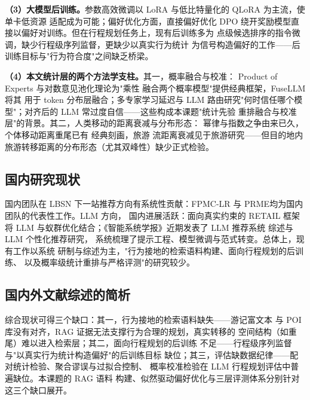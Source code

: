 \textbf{（3）大模型后训练。}参数高效微调以 LoRA\cite{hu2022lora}
与低比特量化的 QLoRA\cite{dettmers2023qlora} 为主流，使单卡低资源
适配成为可能；偏好优化方面，直接偏好优化 DPO\cite{rafailov2023dpo}
绕开奖励模型直接以偏好对训练。但在行程规划任务上，现有后训练多为
点级候选排序的指令微调，缺少行程级序列监督，更缺少以真实行为统计
为信号构造偏好的工作——后训练目标与"行为符合度"之间缺乏桥梁。

\textbf{（4）本文统计层的两个方法学支柱。}其一，概率融合与校准：
Product of Experts\cite{hinton2002poe} 与对数意见池化理论为"乘性
融合两个概率模型"提供经典框架，FuseLLM\cite{wan2024fusellm} 将其
用于 token 分布层融合；多专家学习延迟\cite{mao2023defer}与 LLM
路由\cite{ong2024routellm}研究"何时信任哪个模型"；对齐后的 LLM
常过度自信\cite{guo2017calibration}——这些构成本课题"统计先验
重排融合与校准层"的背景。其二，人类移动的距离衰减与分布形态：
幂律与指数之争由来已久\cite{chen2015decay}，个体移动距离重尾已有
经典刻画\cite{gonzalez2008understanding,simini2012universal}，旅游
流距离衰减见于旅游研究\cite{mckercher2003distance}——但目的地内
旅游转移距离的分布形态（尤其双峰性）缺少正式检验。

\subsection{国内研究现状}

国内团队在 LBSN 下一站推荐方向有系统性贡献：FPMC-LR\cite{cheng2013fpmclr}
与 PRME\cite{feng2015prme}均为国内团队的代表性工作。LLM 方向，
国内进展活跃：面向真实约束的 RETAIL 框架\cite{deng2025retail}将
LLM 与蚁群优化结合；《智能系统学报》近期发表了 LLM 推荐系统
综述\cite{xie2025llmrec}与 LLM 个性化推荐研究\cite{wu2024llmpersorec}，
系统梳理了提示工程、模型微调与范式转变。总体上，现有工作以系统
研制与综述为主，"行为接地的检索语料构建、面向行程规划的后训练、
以及概率级统计重排与严格评测"的研究较少。

\subsection{国内外文献综述的简析}

综合现状可得三个缺口：其一，行为接地的检索语料缺失——游记富文本
与 POI 库没有对齐，RAG 证据无法支撑行为合理的规划，真实转移的
空间结构（如重尾）难以进入检索层；其二，面向行程规划的后训练
不足——行程级序列监督与"以真实行为统计构造偏好"的后训练目标
缺位；其三，评估缺数据纪律——配对统计检验、聚合谬误与过拟合控制、
概率校准检验在 LLM 行程规划评估中普遍缺位。本课题的 RAG 语料
构建、似然驱动偏好优化与三层评测体系分别针对这三个缺口展开。

